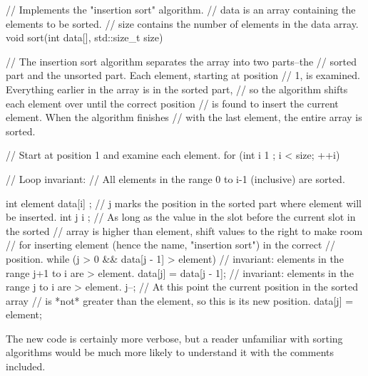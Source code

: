 \begin{cpp}
// Implements the "insertion sort" algorithm.
// data is an array containing the elements to be sorted.
// size contains the number of elements in the data array.
void sort(int data[], std::size_t size)
{
    // The insertion sort algorithm separates the array into two parts--the
    // sorted part and the unsorted part. Each element, starting at position
    // 1, is examined. Everything earlier in the array is in the sorted part,
    // so the algorithm shifts each element over until the correct position
    // is found to insert the current element. When the algorithm finishes
    // with the last element, the entire array is sorted.

    // Start at position 1 and examine each element.
    for (int i { 1 }; i < size; ++i) {
        // Loop invariant:
        //   All elements in the range 0 to i-1 (inclusive) are sorted.

        int element { data[i] };
        // j marks the position in the sorted part where element will be inserted.
        int j { i };
        // As long as the value in the slot before the current slot in the sorted
        // array is higher than element, shift values to the right to make room
        // for inserting element (hence the name, "insertion sort") in the correct
        // position.
        while (j > 0 && data[j - 1] > element) {
            // invariant: elements in the range j+1 to i are > element.
            data[j] = data[j - 1];
            // invariant: elements in the range j to i are > element.
            j--;
        }
        // At this point the current position in the sorted array
        // is *not* greater than the element, so this is its new position.
        data[j] = element;
    }
}
\end{cpp}

The new code is certainly more verbose, but a reader unfamiliar with sorting algorithms would be much more likely to understand it with the comments included.










